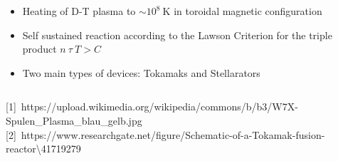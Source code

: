 \documentclass{beamer}
\begin{document}
\begin{frame}
\begin{columns}[onlytextwidth]
\begin{column}{0.45\textwidth}
\begin{center}
\begin{itemize}
				\item Heating of D-T plasma to $\sim10^8~\text{K}$ in toroidal magnetic configuration
				\item Self sustained reaction according to the Lawson Criterion for the triple product $n~\tau~T > C$
				\item Two main types of devices: Tokamaks and Stellarators
			\end{itemize}
		\end{center}
	\end{column}
\end{columns}
	\begin{footnotesize}
	{\tiny [1]~https://upload.wikimedia.org/wikipedia/commons/b/b3/W7X-Spulen\_Plasma\_blau\_gelb.jpg\hfill
\vspace{-0.2cm} [2]~https://www.researchgate.net/figure/Schematic-of-a-Tokamak-fusion-reactor\textbackslash41719279}
\end{footnotesize}
 \end{frame}
\end{document}

